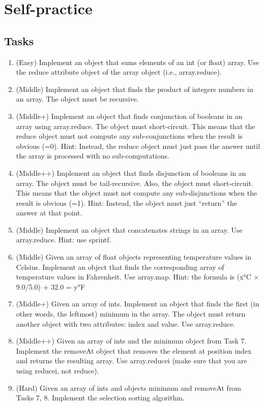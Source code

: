 \documentclass[12pt]{book}
\begin{document}
\section{Self-practice}
\subsection{Tasks}
\begin{enumerate}
    \item (Easy) Implement an object that sums elements of an int (or float) array. Use the reduce attribute object of the array object (i.e., array.reduce). 
    \item (Middle) Implement an object that finds the product of integers numbers in an array. The object must be recursive.
    \item (Middle+) Implement an object that finds conjunction of booleans in an array using array.reduce. The object must short-circuit. This means that the reduce object must not compute any sub-conjunctions when the result is obvious (=0). Hint: Instead, the reduce object must just pass the answer until the array is processed with no sub-computations.
    \item (Middle++) Implement an object that finds disjunction of booleans in an array. The object must be tail-recursive. Also, the object must short-circuit. This means that the object must not compute any sub-disjunctions when the result is obvious (=1). Hint: Instead, the object must just “return” the answer at that point.
    \item (Middle) Implement an object that concatenates strings in an array. Use array.reduce. Hint: use sprintf.
    \item (Middle) Given an array of float objects representing temperature values in Celsius. Implement an object that finds the corresponding array of temperature values in Fahrenheit. Use array.map. Hint: the formula is (x°C × 9.0/5.0) + 32.0 = y°F
    \item (Middle+) Given an array of ints. Implement an object that finds the first (in other words, the leftmost) minimum in the array. The object must return another object with two attributes: index and value. Use array.reduce.
    \item (Middle++) Given an array of ints and the minimum object from Task 7. Implement the removeAt object that removes the element at position index and returns the resulting array. Use array.reducei (make sure that you are using reducei, not reduce). 
    \item (Hard) Given an array of ints and objects minimum and removeAt from Tasks 7, 8. Implement the selection sorting algorithm. 

\end{enumerate}
\end{document}

